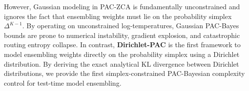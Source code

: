 However, Gaussian modeling in PAC-ZCA is fundamentally unconstrained and ignores the fact that ensembling weights must lie on the probability simplex $\Delta^{K-1}$. By operating on unconstrained log-temperatures, Gaussian PAC-Bayes bounds are prone to numerical instability, gradient explosion, and catastrophic routing entropy collapse. In contrast, \textbf{Dirichlet-PAC} is the first framework to model ensembling weights directly on the probability simplex using a Dirichlet distribution. By deriving the exact analytical KL divergence between Dirichlet distributions, we provide the first simplex-constrained PAC-Bayesian complexity control for test-time model ensembling.
